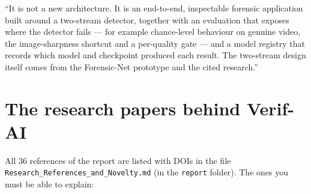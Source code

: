 \documentclass[11pt,a4paper]{report}
\begin{document}
\begin{sayit}
``It is not a new architecture. It is an end-to-end, inspectable forensic application built around a two-stream detector, together with an evaluation that exposes where the detector fails --- for example chance-level behaviour on genuine video, the image-sharpness shortcut and a per-quality gate --- and a model registry that records which model and checkpoint produced each result. The two-stream design itself comes from the Forensic-Net prototype and the cited research.''
\end{sayit}

\section{The research papers behind Verif-AI}
All 36 references of the report are listed with DOIs in the file \texttt{Research\_References\_and\_Novelty.md} (in the \texttt{report} folder). The ones you must be able to explain:
\end{document}
